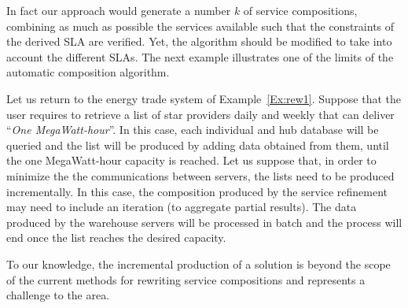   In fact our approach would generate a number $k$ of service compositions, combining as much as possible the services available such that the constraints of the derived SLA are verified. 
 Yet, the algorithm should be modified to take into account the different SLAs. The next example illustrates one of the limits of the automatic composition algorithm.

\begin{example}\label{Ex:rew2}
Let us return to the energy trade system of Example~\ref{Ex:rew1}.
 Suppose that the user requires to retrieve a list of star providers  daily and weekly that can deliver ``\textit{One MegaWatt-hour}''.
In this case, each individual and hub database will be queried and the list will be produced by adding data obtained from them, until the one MegaWatt-hour capacity is reached.
Let us suppose that, in order to minimize the the communications between servers, the lists need to be produced incrementally.
In this case, the composition produced by the service refinement may need to include an iteration (to aggregate partial results). 
The data produced by the warehouse servers will be processed in batch and the process will end once the list reaches the desired capacity.

To our knowledge, the incremental production of a solution is beyond  the scope of the current methods for rewriting service compositions and represents a challenge to the area.
~\hfill\openbox
\end{example}


